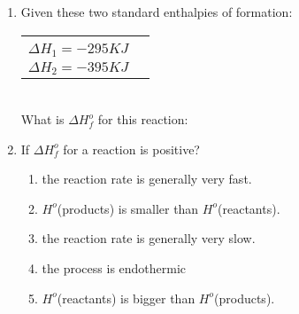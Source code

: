 \documentclass[main.tex]{subfiles}
\begin{document}
\begin{fullwidth}
\begin{multicols*}{2}
\begin{enumerate}
\item  Given these two standard enthalpies of formation:\\
\begin{tabularx}{\columnwidth}{>{}m{.65\linewidth} *{2}{Y} }
   \\
   \\
   \\
\end{tabularx}\\
What is $\Delta H^o_f$ for this reaction:
\begin{center}\end{center}
\begin{enumerate}[label=(\alph*)]\vspace{-0.5cm}
\end{enumerate}\vspace{-0.5cm}

\item If $\Delta H^o_f$ for a reaction is positive?
\begin{enumerate}[label=(\alph*)]
\item  the reaction rate is generally very fast.
\item  $H^o$(products) is smaller than $H^o$(reactants).
\item  the reaction rate is generally very slow.
\item  the process is endothermic
\item  $H^o$(reactants) is bigger than $H^o$(products). 
\end{enumerate}


\end{enumerate}
\end{multicols*}
\end{fullwidth}
\end{document}
